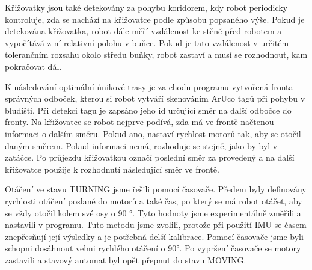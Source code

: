 Křižovatky jsou také detekovány za pohybu koridorem, kdy robot periodicky kontroluje, zda se nachází na křižovatce podle způsobu popsaného výše. Pokud je detekována křižovatka, robot dále měří vzdálenost ke stěně před robotem a vypočítává z ní relativní polohu v buňce. Pokud je tato vzdálenost v určitém tolerančním rozsahu okolo středu buňky, robot zastaví a musí se rozhodnout, kam pokračovat dál.

K následování optimální únikové trasy je za chodu programu vytvořená fronta správných odboček, kterou si robot vytváří skenováním ArUco tagů při pohybu v bludišti. Při detekci tagu je zapsáno jeho id určující směr na další odbočce do fronty. Na křižovatce se robot nejprve podívá, zda má ve frontě načtenou informaci o dalším směru. Pokud ano, nastaví rychlost motorů tak, aby se otočil daným směrem. Pokud informaci nemá, rozhoduje se stejně, jako by byl v zatáčce. Po průjezdu křižovatkou označí poslední směr za provedený a na další křižovatce použije k rozhodnutí následující směr ve frontě.

Otáčení ve stavu TURNING jsme řešili pomocí časovače. Předem byly definovány rychlosti otáčení poslané do motorů a také čas, po který se má robot otáčet, aby se vždy otočil kolem své osy o 90 °. Tyto hodnoty jsme experimentálně změřili a nastavili v programu. Tuto metodu jsme zvolili, protože při použití IMU se časem znepřesňují její výsledky a je potřebná delší kalibrace. Pomocí časovače jsme byli schopni dosáhnout velmi rychlého otáčení o 90°. Po vypršení časovače se motory zastavili a stavový automat byl opět přepnut do stavu MOVING. 
